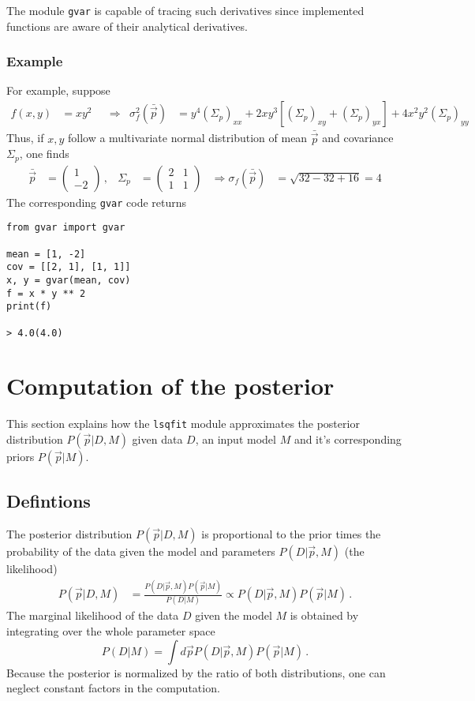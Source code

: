 \documentclass[paper=a4, fontsize=12pt, prl, notitlepage]{revtex4-1}
\begin{document}
The module \texttt{gvar} is capable of tracing such derivatives since implemented functions are aware of their analytical derivatives.

\subsubsection{Example}
For example, suppose
\begin{align}
    f(x, y)
    &=
    x y^2
    && \Rightarrow &
    \sigma_f^2(\bar{\vec p})
    &=
    y^4 (\Sigma_p)_{xx}
    + 2 x y^3  \left[ (\Sigma_p)_{xy} + (\Sigma_p)_{yx} \right]
    + 4 x^2 y^2 (\Sigma_p)_{yy}
\end{align}
Thus, if $x, y$ follow a multivariate normal distribution of mean $\bar{\vec p}$ and covariance $\Sigma_p$, one finds
\begin{align}
    \bar{\vec p}
    &=
    \begin{pmatrix}
        1 \\ -2
    \end{pmatrix}
    \, , &
    \Sigma_p
    &=
    \begin{pmatrix}
        2 & 1 \\ 1 & 1
    \end{pmatrix}
    &
    \Rightarrow
    \sigma_f(\bar{\vec p})
    &=
    \sqrt{32 - 32 + 16} = 4
\end{align}
The corresponding \texttt{gvar} code returns
\begin{lstlisting}[style=python]
from gvar import gvar

mean = [1, -2]
cov = [[2, 1], [1, 1]]
x, y = gvar(mean, cov)
f = x * y ** 2
print(f)

> 4.0(4.0)
\end{lstlisting}


\section{Computation of the posterior}

This section explains how the \texttt{lsqfit} module approximates the posterior distribution $P(\vec p|D,M)$ given data $D$, an input model $M$ and it's corresponding priors $P(\vec p| M)$.

\subsection{Defintions}

The posterior distribution $P(\vec p|D, M)$ is proportional to the prior times the probability of the data given the model and parameters $P(D|\vec p, M)$ (the likelihood)
\begin{align}
    P(\vec p|D, M) &=
    \frac{P(D|\vec p, M)P(\vec p | M)}{P(D|M)}
    \propto
    P(D|\vec p, M)P(\vec p | M)
    \, .
\end{align}
The marginal likelihood of the data $D$ given the model $M$ is obtained by integrating over the whole parameter space
\begin{equation}
    P(D|M)
    =
    \int d \vec p P(D|\vec p, M)P(\vec p | M) \, .
\end{equation}
Because the posterior is normalized by the ratio of both distributions, one can neglect constant factors in the computation.
\end{document}
